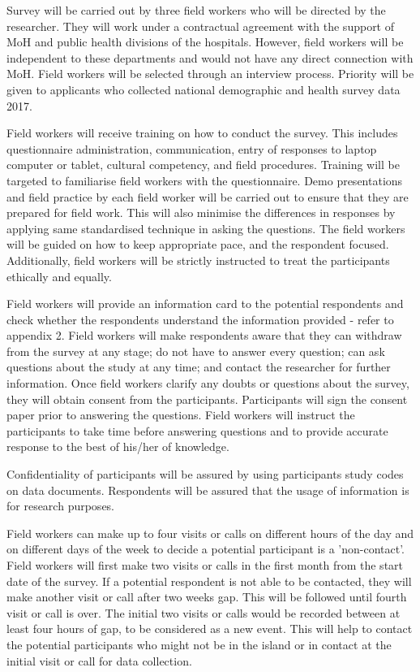 Survey will be carried out by three field workers who will be directed by the researcher. They will work under a contractual agreement with the support of MoH and public health divisions of the hospitals. However, field workers will be independent to these departments and would not have any direct connection with MoH. Field workers will be selected through an interview process. Priority will be given to applicants who collected national demographic and health survey data 2017. 

Field workers will receive training on how to conduct the survey. This includes questionnaire administration, communication, entry of responses to laptop computer or tablet, cultural competency, and field procedures. Training will be targeted to familiarise field workers with the questionnaire. Demo presentations and field practice by each field worker will be carried out to ensure that they are prepared for field work. This will also minimise the differences in responses by applying same standardised technique in asking the questions. The field workers will be guided on how to keep appropriate pace, and the respondent focused. Additionally, field workers will be strictly instructed to treat the participants ethically and equally. 

Field workers will provide an information card to the potential respondents and check whether the respondents understand the information provided - refer to appendix 2. Field workers will make respondents aware that they can withdraw from the survey at any stage; do not have to answer every question; can ask questions about the study at any time; and contact the researcher for further information. Once field workers clarify any doubts or questions about the survey, they will obtain consent from the participants.  Participants will sign the consent paper prior to answering the questions. Field workers will instruct the participants to take time before answering questions and to provide accurate response to the best of his/her of knowledge. 

Confidentiality of participants will be assured by using participants study codes on data documents. Respondents will be assured that the usage of information is for research purposes.

Field workers can make up to four visits or calls on different hours of the day and on different days of the week to decide a potential participant is a 'non-contact'. Field workers will first make two visits or calls in the first month from the start date of the survey. If a potential respondent is not able to be contacted, they will make another visit or call after two weeks gap. This will be followed until fourth visit or call is over. The initial two visits or calls would be recorded between at least four hours of gap, to be considered as a new event. This will help to contact the potential participants who might not be in the island or in contact at the initial visit or call for data collection.

